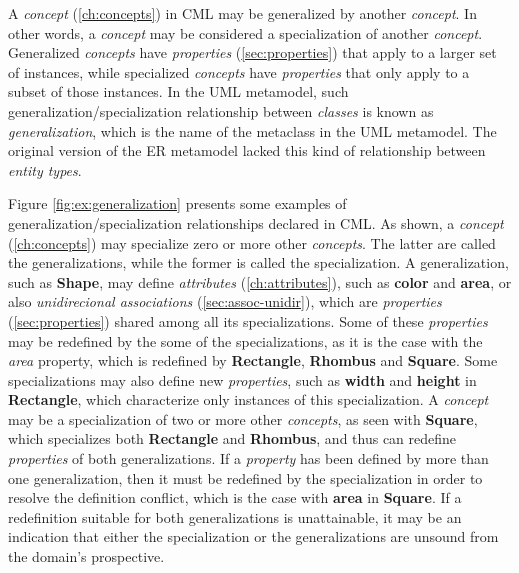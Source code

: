 \begin{definition}
A \emph{concept} (\ref{ch:concepts}) in CML may be generalized by another \emph{concept}.
In other words, a \emph{concept} may be considered a specialization of another \emph{concept}.
Generalized \emph{concepts} have \emph{properties} (\ref{sec:properties})
that apply to a larger set of instances,
while specialized \emph{concepts} have \emph{properties}
that only apply to a subset of those instances.
In the UML \cite{uml} metamodel,
such generalization/specialization relationship between \emph{classes}
is known as \emph{generalization}, which is the name of the metaclass in the UML metamodel.
The original version of the ER \cite{er} metamodel lacked this kind of relationship
between \emph{entity types}.
\end{definition}

\begin{examples}
Figure \ref{fig:ex:generalization} presents some examples of
generalization/specialization relationships declared in CML.
As shown,
a \emph{concept} (\ref{ch:concepts}) may specialize zero or more other \emph{concepts}.
The latter are called the generalizations,
while the former is called the specialization.
A generalization, such as \textbf{Shape},
may define \emph{attributes} (\ref{ch:attributes}),
such as \textbf{color} and \textbf{area},
or also \emph{unidirecional associations} (\ref{sec:assoc-unidir}),
which are \emph{properties} (\ref{sec:properties}) shared among all its specializations.
Some of these \emph{properties} may be redefined by the some of the specializations,
as it is the case with the \emph{area} property,
which is redefined by \textbf{Rectangle}, \textbf{Rhombus} and \textbf{Square}.
Some specializations may also define new \emph{properties},
such as \textbf{width} and \textbf{height} in \textbf{Rectangle},
which characterize only instances of this specialization.
A \emph{concept} may be a specialization of two or more other \emph{concepts},
as seen with \textbf{Square},
which specializes both \textbf{Rectangle} and \textbf{Rhombus},
and thus can redefine \emph{properties} of both generalizations.
If a \emph{property} has been defined by more than one generalization,
then it must be redefined by the specialization
in order to resolve the definition conflict,
which is the case with \textbf{area} in \textbf{Square}. 
If a redefinition suitable for both generalizations is unattainable,
it may be an indication that either the specialization or the generalizations
are unsound from the domain's prospective.
\end{examples}

